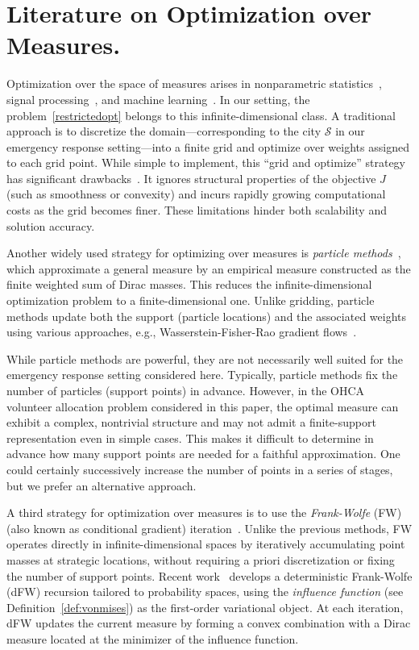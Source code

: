 \documentclass[stsy,sglanonrev]{informs4}
\begin{document}
\section{Literature on Optimization over Measures.}\label{sec:Literature}
Optimization over the space of measures arises in nonparametric statistics~\cite{1960kie,yan2024learning}, signal processing~\cite{eftekhari2019sparse,2017boygeorec}, and machine learning~\cite{2019chublagly,2018mei}. In our setting, the problem~\eqref{restrictedopt} belongs to this infinite-dimensional class. A traditional approach is to discretize the domain—corresponding to the city $\mathcal{S}$ in our emergency response setting—into a finite grid and optimize over weights assigned to each grid point. While simple to implement, this ``grid and optimize'' strategy has significant drawbacks~\cite{2017boygeorec,yu2024det}. It ignores structural properties of the objective \( J \) (such as smoothness or convexity) and incurs rapidly growing computational costs as the grid becomes finer. These limitations hinder both scalability and solution accuracy.

Another widely used strategy for optimizing over measures is \emph{particle methods}~\cite{nitanda2017stoch,chizat2018global,2022bchi,yan2024learning}, which approximate a general measure by an empirical measure constructed as the finite weighted sum of Dirac masses. This reduces the infinite-dimensional optimization problem to a finite-dimensional one. Unlike gridding, particle methods update both the support (particle locations) and the associated weights using various approaches, e.g., Wasserstein-Fisher-Rao gradient flows~\cite{yan2024learning}. 

While particle methods are powerful, they are not necessarily well suited for the emergency response setting considered here. Typically, particle methods fix the number of particles (support points) in advance. However, in the OHCA volunteer allocation problem considered in this paper, the optimal measure can exhibit a complex, nontrivial structure and may not admit a finite-support representation even in simple cases. This makes it difficult to determine in advance how many support points are needed for a faithful approximation. One could certainly successively increase the number of points in a series of stages, but we prefer an alternative approach.

A third strategy for optimization over measures is to use the \emph{Frank-Wolfe} (FW) (also known as conditional gradient) iteration~\cite{2017boygeorec,denoyelle2019sliding,kent2021frankwolfe,yu2024det}. Unlike the previous methods, FW operates directly in infinite-dimensional spaces by iteratively accumulating point masses at strategic locations, without requiring a priori discretization or fixing the number of support points. Recent work~\cite{yu2024det} develops a deterministic Frank-Wolfe (dFW) recursion tailored to probability spaces, using the \emph{influence function} (see Definition~\ref{def:vonmises}) as the first-order variational object. At each iteration, dFW updates the current measure by forming a convex combination with a Dirac measure located at the minimizer of the influence function.
\end{document}
